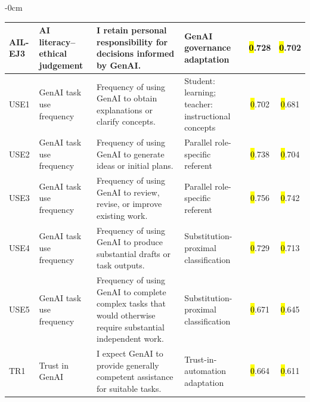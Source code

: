 \documentclass[sustainability,article,accept,moreauthors]{Definitions/mdpi}
\begin{document}
\begin{table}[H]
\begin{adjustwidth}{-\extralength}{0cm}
\begin{tabular}{p{1.2cm}p{4cm}p{5cm}p{4cm}cc}
AIL-EJ3 & AI literacy--ethical judgement & I retain personal responsibility for decisions informed by GenAI. & GenAI governance adaptation &\hl{0}.728 &\hl{0}.702 \\\midrule
USE1 & GenAI task use frequency & Frequency of using GenAI to obtain explanations or clarify concepts. & Student: learning; teacher: instructional concepts &\hl{0}.702 &\hl{0}.681 \\\midrule






USE2 & GenAI task use frequency & Frequency of using GenAI to generate ideas or initial plans. & Parallel role-specific referent &\hl{0}.738 &\hl{0}.704 \\\midrule
USE3 & GenAI task use frequency & Frequency of using GenAI to review, revise, or improve existing work. & Parallel role-specific referent &\hl{0}.756 &\hl{0}.742 \\\midrule
USE4 & GenAI task use frequency & Frequency of using GenAI to produce substantial drafts or task outputs. & Substitution-proximal classification &\hl{0}.729 &\hl{0}.713 \\\midrule
USE5 & GenAI task use frequency & Frequency of using GenAI to complete complex tasks that would otherwise require substantial independent work. & Substitution-proximal classification &\hl{0}.671 &\hl{0}.645 \\\midrule
TR1 & Trust in GenAI & I expect GenAI to provide generally competent assistance for suitable tasks. & Trust-in-automation adaptation~\cite{lee2004,hoff2015} &\hl{0}.664 &\hl{0}.611 \\

\bottomrule
\end{tabular}
\end{adjustwidth}
\end{table}
\end{document}
